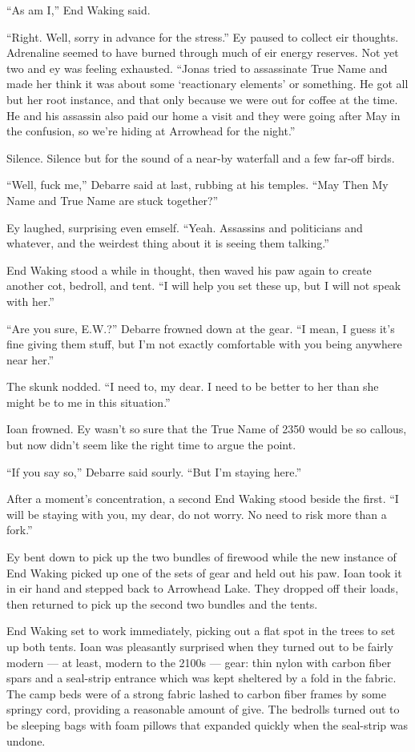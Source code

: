 ``As am I,'' End Waking said.

``Right. Well, sorry in advance for the stress.'' Ey paused to collect eir thoughts. Adrenaline seemed to have burned through much of eir energy reserves. Not yet two and ey was feeling exhausted. ``Jonas tried to assassinate True Name and made her think it was about some `reactionary elements' or something. He got all but her root instance, and that only because we were out for coffee at the time. He and his assassin also paid our home a visit and they were going after May in the confusion, so we're hiding at Arrowhead for the night.''

Silence. Silence but for the sound of a near-by waterfall and a few far-off birds.

``Well, fuck me,'' Debarre said at last, rubbing at his temples. ``May Then My Name and True Name are stuck together?''

Ey laughed, surprising even emself. ``Yeah. Assassins and politicians and whatever, and the weirdest thing about it is seeing them talking.''

End Waking stood a while in thought, then waved his paw again to create another cot, bedroll, and tent. ``I will help you set these up, but I will not speak with her.''

``Are you sure, E.W.?'' Debarre frowned down at the gear. ``I mean, I guess it's fine giving them stuff, but I'm not exactly comfortable with you being anywhere near her.''

The skunk nodded. ``I need to, my dear. I need to be better to her than she might be to me in this situation.''

Ioan frowned. Ey wasn't so sure that the True Name of 2350 would be so callous, but now didn't seem like the right time to argue the point.

``If you say so,'' Debarre said sourly. ``But I'm staying here.''

After a moment's concentration, a second End Waking stood beside the first. ``I will be staying with you, my dear, do not worry. No need to risk more than a fork.''

Ey bent down to pick up the two bundles of firewood while the new instance of End Waking picked up one of the sets of gear and held out his paw. Ioan took it in eir hand and stepped back to Arrowhead Lake. They dropped off their loads, then returned to pick up the second two bundles and the tents.

End Waking set to work immediately, picking out a flat spot in the trees to set up both tents. Ioan was pleasantly surprised when they turned out to be fairly modern — at least, modern to the 2100s — gear: thin nylon with carbon fiber spars and a seal-strip entrance which was kept sheltered by a fold in the fabric. The camp beds were of a strong fabric lashed to carbon fiber frames by some springy cord, providing a reasonable amount of give. The bedrolls turned out to be sleeping bags with foam pillows that expanded quickly when the seal-strip was undone.

